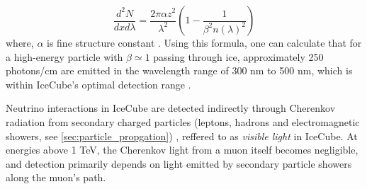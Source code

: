\begin{equation}\label{eq:cherenkov_ph}
    \frac{d^2N}{dxd\lambda} = \frac{2\pi \alpha z^2}{\lambda^2} \left( 1 - \frac{1}{\beta^2 n(\lambda)^2} \right)
\end{equation}
where, $\alpha$ is fine structure constant . Using this formula, one can calculate that for a high-energy particle with $\beta \simeq 1$ passing through ice, approximately 250 photons/cm are emitted in the wavelength range of 300 nm to 500 nm, which is within IceCube's optimal detection range . 

Neutrino interactions in IceCube are detected indirectly through Cherenkov radiation from secondary charged particles (leptons, hadrons and electromagnetic showers, see \ref{sec:particle_propgation}) , reffered to as \emph{visible light} in IceCube. At energies above 1 TeV, the Cherenkov light from a muon itself becomes negligible, and detection primarily depends on light emitted by secondary particle showers along the muon's path. 

